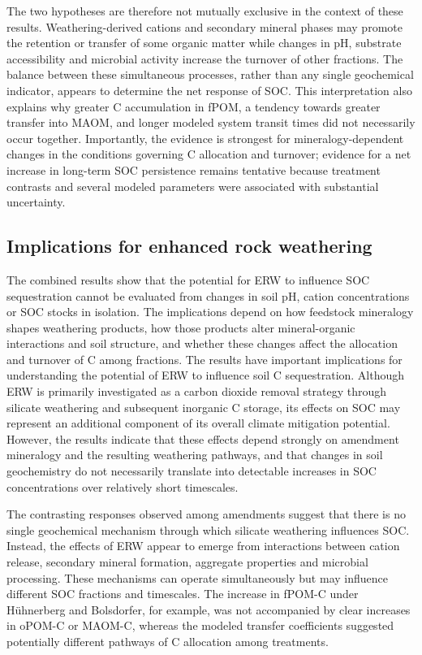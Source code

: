 \documentclass[preprint,12pt]{elsarticle}
\begin{document}
The two hypotheses are therefore not mutually exclusive in the context of these results. Weathering-derived cations and secondary mineral phases may promote the retention or transfer of some organic matter while changes in pH, substrate accessibility and microbial activity increase the turnover of other fractions. The balance between these simultaneous processes, rather than any single geochemical indicator, appears to determine the net response of SOC. This interpretation also explains why greater C accumulation in fPOM, a tendency towards greater transfer into MAOM, and longer modeled system transit times did not necessarily occur together. Importantly, the evidence is strongest for mineralogy-dependent changes in the conditions governing C allocation and turnover; evidence for a net increase in long-term SOC persistence remains tentative because treatment contrasts and several modeled parameters were associated with substantial uncertainty.

\subsection{Implications for enhanced rock weathering}
\label{subsec:erw_implications}

The combined results show that the potential for ERW to influence SOC sequestration cannot be evaluated from changes in soil pH, cation concentrations or SOC stocks in isolation. The implications depend on how feedstock mineralogy shapes weathering products, how those products alter mineral-organic interactions and soil structure, and whether these changes affect the allocation and turnover of C among fractions. The results have important implications for understanding the potential of ERW to influence soil C sequestration. Although ERW is primarily investigated as a carbon dioxide removal strategy through silicate weathering and subsequent inorganic C storage, its effects on SOC may represent an additional component of its overall climate mitigation potential. However, the results indicate that these effects depend strongly on amendment mineralogy and the resulting weathering pathways, and that changes in soil geochemistry do not necessarily translate into detectable increases in SOC concentrations over relatively short timescales.

The contrasting responses observed among amendments suggest that there is no single geochemical mechanism through which silicate weathering influences SOC. Instead, the effects of ERW appear to emerge from interactions between cation release, secondary mineral formation, aggregate properties and microbial processing. These mechanisms can operate simultaneously but may influence different SOC fractions and timescales. The increase in fPOM-C under Hühnerberg and Bolsdorfer, for example, was not accompanied by clear increases in oPOM-C or MAOM-C, whereas the modeled transfer coefficients suggested potentially different pathways of C allocation among treatments.
\end{document}
